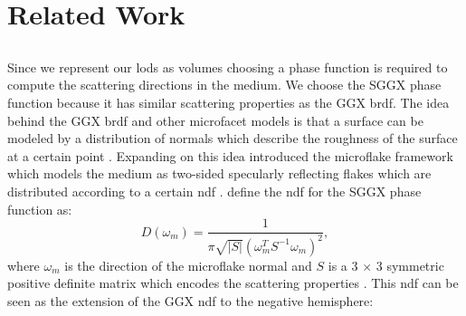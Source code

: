 \chapter{Related Work}

\section{}
Since we represent our \acp{lod} as volumes choosing a phase function is required to compute the scattering directions in the medium.
We choose the SGGX phase function because it has similar scattering properties as the GGX \ac{brdf}\cite[p. 2]{sggx}.
The idea behind the GGX \ac{brdf} and other microfacet models is that a surface can be modeled by a distribution of normals which describe the roughness of the surface at a certain point \cite[p. 3]{ggx}.
Expanding on this idea \citeauthor{microflake} introduced the microflake framework which models the medium as two-sided specularly reflecting flakes which are distributed according to a certain \ac{ndf} \cite[pp. 4-5]{microflake}.
\citeauthor{sggx} define the \ac{ndf} for the SGGX phase function as:
\begin{equation}
    D(\omega_m)=\frac{1}{\pi \sqrt{|S|}(\omega_m^T S^{-1} \omega_m)^2},
\end{equation}
where $\omega_m$ is the direction of the microflake normal and $S$ is a 3 $\times$ 3 symmetric positive definite matrix which encodes the scattering properties \cite[p. 4]{sggx}.
This \ac{ndf} can be seen as the extension of the GGX \acs{ndf} to the negative hemisphere:
